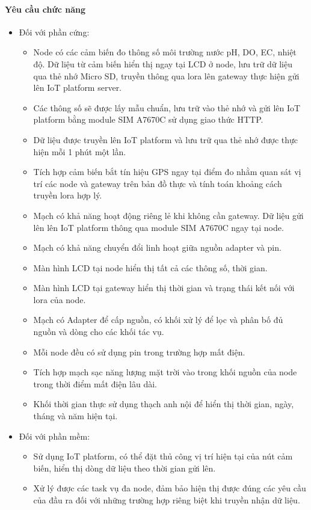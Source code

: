 \documentclass{article} %
\begin{document}
	\paragraph{Yêu cầu chức năng}\mbox{}
	
	\begin{itemize}
		\item  Đối với phần cứng:
		\begin{itemize}[label=$\ast$]
			\item Node có các cảm biến đo thông số môi trường nước pH, DO, EC, nhiệt độ. Dữ liệu từ cảm biến hiển thị ngay tại LCD ở node, lưu trữ dữ liệu qua thẻ nhớ Micro SD, truyền thông qua lora lên gateway thực hiện gửi lên IoT platform server.
			\item Các thông số sẽ được lấy mẫu chuẩn, lưu trữ vào thẻ nhớ và gửi lên IoT platform bằng module SIM A7670C sử dụng giao thức HTTP.
			\item Dữ liệu được truyền lên IoT platform và lưu trữ qua thẻ nhớ được thực hiện mỗi 1 phút một lần.
			\item Tích hợp cảm biến bắt tín hiệu GPS ngay tại điểm đo nhằm quan sát vị trí các node và gateway trên bản đồ thực và tính toán khoảng cách truyền lora hợp lý.
			\item Mạch có khả năng hoạt động riêng lẻ khi không cần gateway. Dữ liệu gửi lên lên IoT platform thông qua module SIM A7670C ngay tại node.
			\item Mạch có khả năng chuyển đổi linh hoạt giữa nguồn adapter và pin.
			\item Màn hình LCD tại node hiển thị tất cả các thông số, thời gian.
			\item Màn hình LCD tại gateway hiển thị thời gian và trạng thái kết nối với lora của node.
			\item Mạch có Adapter để cấp nguồn, có khối xử lý để lọc và phân bố đủ nguồn và dòng cho các khối tác vụ.
			\item Mỗi node đều có sử dụng pin trong trường hợp mất điện.
			\item Tích hợp mạch sạc năng lượng mặt trời vào trong khối nguồn của node trong thời điểm mất điện lâu dài.
			\item Khối thời gian thực sử dụng thạch anh nội để hiển thị thời gian, ngày, tháng và năm hiện tại.
		\end{itemize}
		
		\item Đối với phần mềm:
		\begin{itemize}[label=$\ast$]
			\item Sử dụng IoT platform, có thể đặt thủ công vị trí hiện tại của nút cảm biến, hiển thị dòng dữ liệu theo thời gian gửi lên.
			\item Xử lý được các task vụ đa node, đảm bảo hiện thị được đúng các yêu cầu của đầu ra đối với những trường hợp riêng biệt khi truyền nhận dữ liệu.
		\end{itemize}
	\end{itemize}
\end{document}
